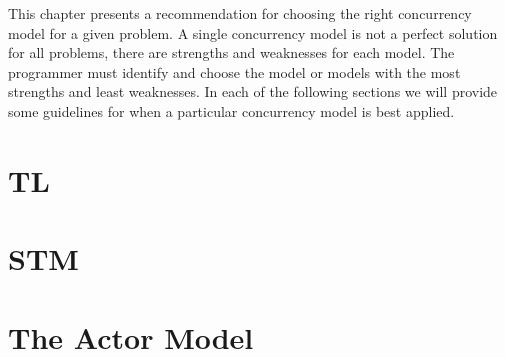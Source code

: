 \makeatletter {}\makeatother
{}
This chapter presents a recommendation for choosing the right concurrency model for a given problem. A single concurrency model is not a perfect solution for all problems, there are strengths and weaknesses for each model. The programmer must identify and choose the model or models with the most strengths and least weaknesses. In each of the following sections we will provide some guidelines for when a particular concurrency model is best applied.

\label{chap:choosing_con_model}

\section{\acl{TL}}\label{sec:choose_TL}

\section{\acl{STM}}\label{sec:choose_STM}

\section{The Actor Model}\label{sec:choose_Actor}

\worksheetend